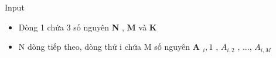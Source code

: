 Input
\begin{itemize}
	\item     Dòng 1 chứa 3 số nguyên    \textbf{     N    }    ,    \textbf{     M    }    và    \textbf{     K    }
	\item     N dòng tiếp theo, dòng thứ i chứa M số nguyên    \textbf{     A     $_      i, 1     $}    ,    \textbf{     $A_{i,2}$}    , ...,    \textbf{     $A_{i,M}$}
\end{itemize}